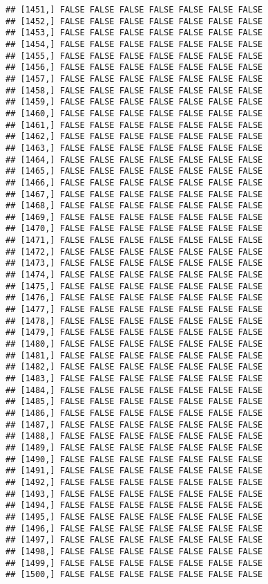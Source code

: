 \documentclass[
]{article}
\begin{document}
\begin{verbatim}
## [1451,] FALSE FALSE FALSE FALSE FALSE FALSE FALSE
## [1452,] FALSE FALSE FALSE FALSE FALSE FALSE FALSE
## [1453,] FALSE FALSE FALSE FALSE FALSE FALSE FALSE
## [1454,] FALSE FALSE FALSE FALSE FALSE FALSE FALSE
## [1455,] FALSE FALSE FALSE FALSE FALSE FALSE FALSE
## [1456,] FALSE FALSE FALSE FALSE FALSE FALSE FALSE
## [1457,] FALSE FALSE FALSE FALSE FALSE FALSE FALSE
## [1458,] FALSE FALSE FALSE FALSE FALSE FALSE FALSE
## [1459,] FALSE FALSE FALSE FALSE FALSE FALSE FALSE
## [1460,] FALSE FALSE FALSE FALSE FALSE FALSE FALSE
## [1461,] FALSE FALSE FALSE FALSE FALSE FALSE FALSE
## [1462,] FALSE FALSE FALSE FALSE FALSE FALSE FALSE
## [1463,] FALSE FALSE FALSE FALSE FALSE FALSE FALSE
## [1464,] FALSE FALSE FALSE FALSE FALSE FALSE FALSE
## [1465,] FALSE FALSE FALSE FALSE FALSE FALSE FALSE
## [1466,] FALSE FALSE FALSE FALSE FALSE FALSE FALSE
## [1467,] FALSE FALSE FALSE FALSE FALSE FALSE FALSE
## [1468,] FALSE FALSE FALSE FALSE FALSE FALSE FALSE
## [1469,] FALSE FALSE FALSE FALSE FALSE FALSE FALSE
## [1470,] FALSE FALSE FALSE FALSE FALSE FALSE FALSE
## [1471,] FALSE FALSE FALSE FALSE FALSE FALSE FALSE
## [1472,] FALSE FALSE FALSE FALSE FALSE FALSE FALSE
## [1473,] FALSE FALSE FALSE FALSE FALSE FALSE FALSE
## [1474,] FALSE FALSE FALSE FALSE FALSE FALSE FALSE
## [1475,] FALSE FALSE FALSE FALSE FALSE FALSE FALSE
## [1476,] FALSE FALSE FALSE FALSE FALSE FALSE FALSE
## [1477,] FALSE FALSE FALSE FALSE FALSE FALSE FALSE
## [1478,] FALSE FALSE FALSE FALSE FALSE FALSE FALSE
## [1479,] FALSE FALSE FALSE FALSE FALSE FALSE FALSE
## [1480,] FALSE FALSE FALSE FALSE FALSE FALSE FALSE
## [1481,] FALSE FALSE FALSE FALSE FALSE FALSE FALSE
## [1482,] FALSE FALSE FALSE FALSE FALSE FALSE FALSE
## [1483,] FALSE FALSE FALSE FALSE FALSE FALSE FALSE
## [1484,] FALSE FALSE FALSE FALSE FALSE FALSE FALSE
## [1485,] FALSE FALSE FALSE FALSE FALSE FALSE FALSE
## [1486,] FALSE FALSE FALSE FALSE FALSE FALSE FALSE
## [1487,] FALSE FALSE FALSE FALSE FALSE FALSE FALSE
## [1488,] FALSE FALSE FALSE FALSE FALSE FALSE FALSE
## [1489,] FALSE FALSE FALSE FALSE FALSE FALSE FALSE
## [1490,] FALSE FALSE FALSE FALSE FALSE FALSE FALSE
## [1491,] FALSE FALSE FALSE FALSE FALSE FALSE FALSE
## [1492,] FALSE FALSE FALSE FALSE FALSE FALSE FALSE
## [1493,] FALSE FALSE FALSE FALSE FALSE FALSE FALSE
## [1494,] FALSE FALSE FALSE FALSE FALSE FALSE FALSE
## [1495,] FALSE FALSE FALSE FALSE FALSE FALSE FALSE
## [1496,] FALSE FALSE FALSE FALSE FALSE FALSE FALSE
## [1497,] FALSE FALSE FALSE FALSE FALSE FALSE FALSE
## [1498,] FALSE FALSE FALSE FALSE FALSE FALSE FALSE
## [1499,] FALSE FALSE FALSE FALSE FALSE FALSE FALSE
## [1500,] FALSE FALSE FALSE FALSE FALSE FALSE FALSE

\end{verbatim}
\end{document}
